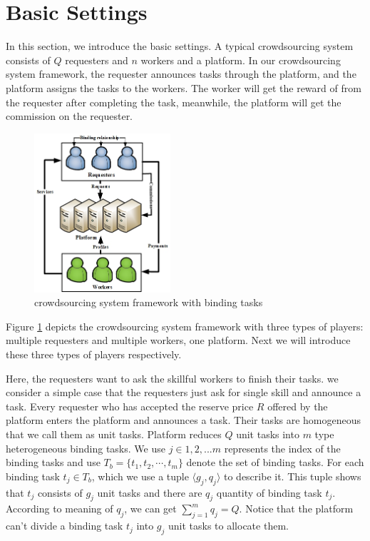 \section{Basic Settings}
In this section, we introduce the basic settings. A typical crowdsourcing system consists of $Q$ requesters and $n$ workers and a platform. In our crowdsourcing system framework, the requester announces tasks through the platform, and the platform assigns the tasks to the workers. The worker will get the reward of from the requester after completing the task, meanwhile, the platform will get the commission on the requester.
\begin{figure}
    \includegraphics[height=0.45\textwidth, width=0.45\textwidth]{crowdsourcing_system}
    \caption{crowdsourcing system framework with binding tasks}\label{img1}
\end{figure}

Figure \ref{img1} depicts the crowdsourcing system framework with three types of players: multiple requesters and multiple workers, one platform. Next we will introduce these three types of players respectively.

Here, the requesters want to ask the skillful workers to finish their tasks. we consider a simple case that the requesters just ask for single skill and announce a task. Every requester who has accepted the reserve price $R$ offered by the platform enters the platform and announces a task. Their tasks are homogeneous that we call them as unit tasks. Platform reduces $Q$ unit tasks into $m$ type heterogeneous binding tasks. We use $j \in {1,2,... m}$ represents the index of the binding tasks and use $T_{b} = \{t_1,t_2,\cdots,t_m\}$ denote the set of binding tasks. For each binding task $t_j \in T_{b}$, which we use a tuple $\langle g_j,q_j \rangle$ to describe it. This tuple shows that $t_j$ consists of $g_j$ unit tasks and there are $q_j$ quantity of binding task $t_j$. According to meaning of $q_j$, we can get $\sum_{j=1}^{m} q_j = Q$. Notice that the platform can't divide a binding task $t_j$ into $g_j$ unit tasks to allocate them.


